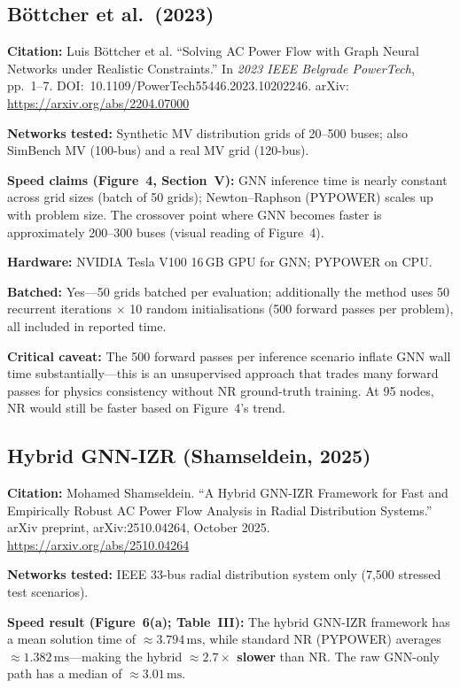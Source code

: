 \documentclass[11pt]{article}
\begin{document}
\subsection{B\"{o}ttcher et al.\ (2023)}

\textbf{Citation:} Luis B\"{o}ttcher et al.
``Solving AC Power Flow with Graph Neural Networks under Realistic
Constraints.''
In \textit{2023 IEEE Belgrade PowerTech}, pp.~1--7.
DOI:~10.1109/PowerTech55446.2023.10202246.
arXiv: \url{https://arxiv.org/abs/2204.07000}

\textbf{Networks tested:} Synthetic MV distribution grids of 20--500 buses;
also SimBench MV (100-bus) and a real MV grid (120-bus).

\textbf{Speed claims (Figure~4, Section~V):}
GNN inference time is nearly constant across grid sizes (batch of 50 grids);
Newton--Raphson (PYPOWER) scales up with problem size.
The crossover point where GNN becomes faster is approximately 200--300 buses
(visual reading of Figure~4).

\textbf{Hardware:} NVIDIA Tesla V100 16\,GB GPU for GNN; PYPOWER on CPU.

\textbf{Batched:} Yes---50 grids batched per evaluation; additionally the
method uses 50 recurrent iterations $\times$ 10 random initialisations
(500 forward passes per problem), all included in reported time.

\textbf{Critical caveat:}  The 500 forward passes per inference scenario
inflate GNN wall time substantially---this is an unsupervised approach that
trades many forward passes for physics consistency without NR ground-truth
training.  At 95 nodes, NR would still be faster based on Figure~4's trend.

\subsection{Hybrid GNN-IZR (Shamseldein, 2025)}

\textbf{Citation:} Mohamed Shamseldein.
``A Hybrid GNN-IZR Framework for Fast and Empirically Robust AC Power Flow
Analysis in Radial Distribution Systems.''
arXiv preprint, arXiv:2510.04264, October 2025.
\url{https://arxiv.org/abs/2510.04264}

\textbf{Networks tested:} IEEE 33-bus radial distribution system only
(7,500 stressed test scenarios).

\textbf{Speed result (Figure~6(a); Table~III):}
The hybrid GNN-IZR framework has a mean solution time of ${\approx}3.794\,\text{ms}$,
while standard NR (PYPOWER) averages ${\approx}1.382\,\text{ms}$---making the
hybrid \textcolor{warnred}{\textbf{${\approx}2.7\times$ slower}} than NR.
The raw GNN-only path has a median of ${\approx}3.01\,\text{ms}$.
\end{document}
